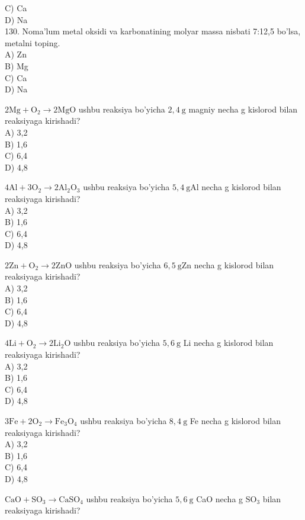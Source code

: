 C) Ca\\
D) Na\\
130. Noma'lum metal oksidi va karbonatining molyar massa nisbati 7:12,5 bo'lsa, metalni toping.\\
A) Zn\\
B) Mg\\
C) Ca\\
D) Na
  \item $2 \mathrm{Mg}+\mathrm{O}_{2} \rightarrow 2 \mathrm{MgO}$ ushbu reaksiya bo'yicha $2,4 \mathrm{~g}$ magniy necha g kislorod bilan reaksiyaga kirishadi?\\
A) 3,2\\
B) 1,6\\
C) 6,4\\
D) 4,8
  \item $4 \mathrm{Al}+3 \mathrm{O}_{2} \rightarrow 2 \mathrm{Al}_{2} \mathrm{O}_{3}$ ushbu reaksiya bo'yicha $5,4 \mathrm{~g} \mathrm{Al}$ necha g kislorod bilan reaksiyaga kirishadi?\\
A) 3,2\\
B) 1,6\\
C) 6,4\\
D) 4,8
  \item $2 \mathrm{Zn}+\mathrm{O}_{2} \rightarrow 2 \mathrm{ZnO}$ ushbu reaksiya bo'yicha $6,5 \mathrm{~g} \mathrm{Zn}$ necha g kislorod bilan reaksiyaga kirishadi?\\
A) 3,2\\
B) 1,6\\
C) 6,4\\
D) 4,8
  \item $4 \mathrm{Li}+\mathrm{O}_{2} \rightarrow 2 \mathrm{Li}_{2} \mathrm{O}$ ushbu reaksiya bo'yicha $5,6 \mathrm{~g}$ Li necha g kislorod bilan reaksiyaga kirishadi?\\
A) 3,2\\
B) 1,6\\
C) 6,4\\
D) 4,8
  \item $3 \mathrm{Fe}+2 \mathrm{O}_{2} \rightarrow \mathrm{Fe}_{3} \mathrm{O}_{4}$ ushbu reaksiya bo'yicha $8,4 \mathrm{~g}$ Fe necha g kislorod bilan reaksiyaga kirishadi?\\
A) 3,2\\
B) 1,6\\
C) 6,4\\
D) 4,8
  \item $\mathrm{CaO}+\mathrm{SO}_{3} \rightarrow \mathrm{CaSO}_{4}$ ushbu reaksiya bo'yicha $5,6 \mathrm{~g}$ CaO necha g $\mathrm{SO}_{3}$ bilan reaksiyaga kirishadi?\\
